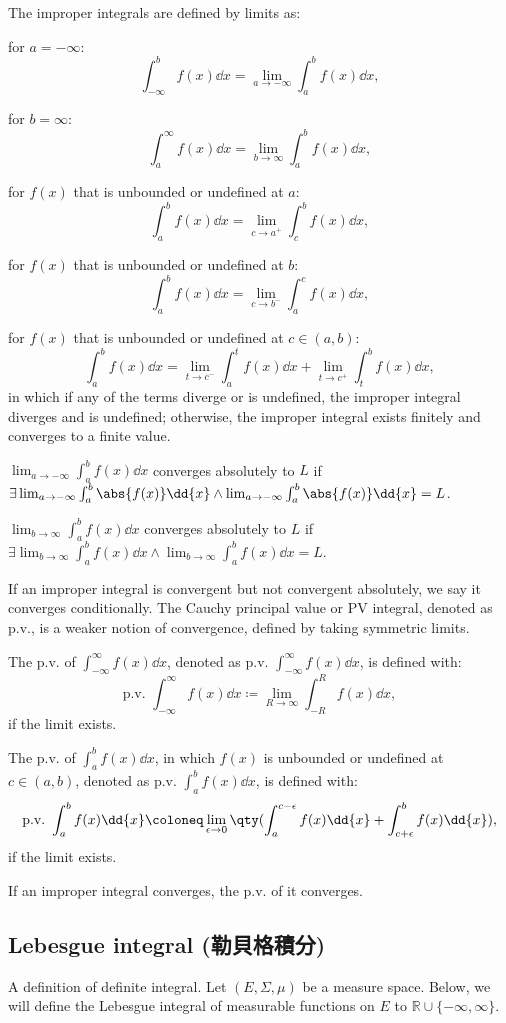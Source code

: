 \documentclass[a4paper,12pt]{report}
\begin{document}
The improper integrals are defined by limits as:
\bit
\item for $a=-\infty$:
\[\int _{-\infty }^bf(x)\dd{x}=\lim _{a\to -\infty }\int _{a}^{b}f(x)\dd{x},\]
\item for $b=\infty$:
\[\int _{a}^{\infty }f(x)\dd{x}=\lim _{b\to \infty }\int _{a}^{b}f(x)\dd{x},\]
\item for $f(x)$ that is unbounded or undefined at $a$:
\[\int_a^bf(x)\dd{x}=\lim_{c\to a^+}\int_c^bf(x)\dd{x},\]
\item for $f(x)$ that is unbounded or undefined at $b$:
\[\int_a^bf(x)\dd{x}=\lim_{c\to b^-}\int_a^cf(x)\dd{x},\]
\item for $f(x)$ that is unbounded or undefined at $c\in(a,b)$:
\[\int _{a}^{b}f(x)\dd{x}=\lim_{t\to c^-}\int _{a}^{t}f(x)\dd{x}+\lim_{t\to c^+}\int _{t}^{b}f(x)\dd{x},\]
\eit
in which if any of the terms diverge or is undefined, the improper integral diverges and is undefined; otherwise, the improper integral exists finitely and converges to a finite value.

$\lim _{a\to -\infty }\int _{a}^{b}f(x)\dd{x}$ converges absolutely to $L$ if $\exists\lim _{a\to -\infty }\int _{a}^{b}\abs{f(x)}\dd{x}\land\lim _{a\to -\infty }\int _{a}^{b}\abs{f(x)}\dd{x}=L$.

$\lim _{b\to \infty }\int _{a}^{b}f(x)\dd{x}$ converges absolutely to $L$ if $\exists\lim _{b\to \infty }\int _{a}^{b}f(x)\dd{x}\land\lim _{b\to \infty }\int _{a}^{b}f(x)\dd{x}=L$.

If an improper integral is convergent but not convergent absolutely, we say it converges conditionally.
The Cauchy principal value or PV integral, denoted as p.v., is a weaker notion of convergence, defined by taking symmetric limits. 

The p.v. of $\int _{-\infty}^{\infty}f(x)\dd{x}$, denoted as $\text{p.v.\ }\int_{-\infty}^{\infty} f(x)\dd{x}$, is defined with:
\[\text{p.v.\ }\int_{-\infty}^{\infty} f(x)\dd{x}\coloneq\lim_{R\to\infty} \int_{-R}^{R} f(x)\dd{x},\]
if the limit exists.

The p.v. of $\int _{a}^{b}f(x)\dd{x}$, in which $f(x)$ is unbounded or undefined at $c\in (a,b)$, denoted as $\text{p.v.\ }\int_{a}^{b} f(x)\dd{x}$, is defined with:
\[\text{p.v.\ }\int_{a}^{b} f(x)\dd{x}\coloneq\lim_{\epsilon\to 0}\qty(\int_a^{c-\epsilon}f(x)\dd{x}+\int_{c+\epsilon}^bf(x)\dd{x}),\]
if the limit exists.

If an improper integral converges, the p.v. of it converges.
\subsection{Lebesgue integral (勒貝格積分)}
A definition of definite integral.
Let $(E,\Sigma,\mu)$ be a measure space. Below, we will define the Lebesgue integral of measurable functions on $E$ to $\mathbb{R}\cup\{-\infty,\infty\}$.
\end{document}
